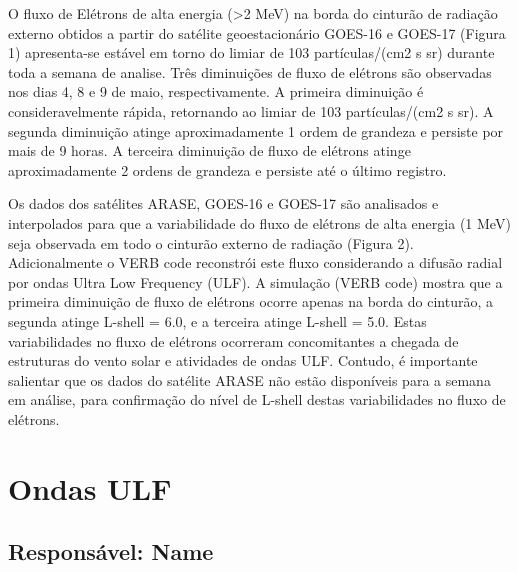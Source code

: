 \documentclass[a4paper, 10pt]{article}
\begin{document}
                     O fluxo de Elétrons de alta energia (>2 MeV) na borda do cinturão de radiação externo obtidos a partir do satélite geoestacionário GOES-16 e GOES-17 (Figura 1) apresenta-se estável em torno do limiar de 103 partículas/(cm2 s sr) durante toda a semana de analise. Três diminuições de fluxo de elétrons são observadas nos dias 4, 8 e 9 de maio, respectivamente. A primeira diminuição é consideravelmente rápida, retornando ao limiar de 103 partículas/(cm2 s sr). A segunda diminuição atinge aproximadamente 1 ordem de grandeza e persiste por mais de 9 horas. A terceira diminuição de fluxo de elétrons atinge aproximadamente 2 ordens de grandeza e persiste até o último registro. 

Os dados dos satélites ARASE, GOES-16 e GOES-17 são analisados e interpolados para que a variabilidade do fluxo de elétrons de alta energia (1 MeV) seja observada em todo o cinturão externo de radiação (Figura 2). Adicionalmente o VERB code reconstrói este fluxo considerando a difusão radial por ondas Ultra Low Frequency (ULF). A simulação (VERB code) mostra que a primeira diminuição de fluxo de elétrons ocorre apenas na borda do cinturão, a segunda atinge L-shell = 6.0, e a terceira atinge L-shell = 5.0. Estas variabilidades no fluxo de elétrons ocorreram concomitantes a chegada de estruturas do vento solar e atividades de ondas ULF. Contudo, é importante salientar que os dados do satélite ARASE não estão disponíveis para a semana em análise, para confirmação do nível de L-shell destas variabilidades no fluxo de elétrons.



\section{Ondas ULF} 
 \subsection{Responsável: Name} 
 
\end{document}
